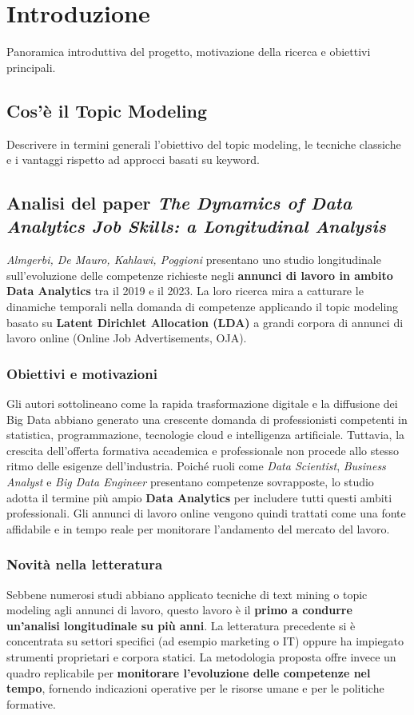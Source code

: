 \chapter{Introduzione}
Panoramica introduttiva del progetto, motivazione della ricerca e obiettivi principali.

\section{Cos'è il Topic Modeling}
Descrivere in termini generali l'obiettivo del topic modeling, le tecniche classiche e i vantaggi rispetto ad approcci basati su keyword.

\section{Analisi del paper \emph{The Dynamics of Data Analytics Job Skills: a Longitudinal Analysis}}

\textit{Almgerbi, De Mauro, Kahlawi, Poggioni} presentano uno studio longitudinale sull'evoluzione delle competenze richieste negli \textbf{annunci di lavoro in ambito Data Analytics} tra il 2019 e il 2023. 
La loro ricerca mira a catturare le dinamiche temporali nella domanda di competenze applicando il topic modeling basato su \textbf{Latent Dirichlet Allocation (LDA)} a grandi corpora di annunci di lavoro online (Online Job Advertisements, OJA).

\subsection{Obiettivi e motivazioni}
Gli autori sottolineano come la rapida trasformazione digitale e la diffusione dei Big Data abbiano generato una crescente domanda di professionisti competenti in statistica, programmazione, tecnologie cloud e intelligenza artificiale.
Tuttavia, la crescita dell'offerta formativa accademica e professionale non procede allo stesso ritmo delle esigenze dell'industria.
Poiché ruoli come \textit{Data Scientist}, \textit{Business Analyst} e \textit{Big Data Engineer} presentano competenze sovrapposte, lo studio adotta il termine più ampio \textbf{Data Analytics} per includere tutti questi ambiti professionali.
Gli annunci di lavoro online vengono quindi trattati come una fonte affidabile e in tempo reale per monitorare l'andamento del mercato del lavoro.

\subsection{Novità nella letteratura}
Sebbene numerosi studi abbiano applicato tecniche di text mining o topic modeling agli annunci di lavoro, questo lavoro è il \textbf{primo a condurre un'analisi longitudinale su più anni}.
La letteratura precedente si è concentrata su settori specifici (ad esempio marketing o IT) oppure ha impiegato strumenti proprietari e corpora statici.
La metodologia proposta offre invece un quadro replicabile per \textbf{monitorare l'evoluzione delle competenze nel tempo}, fornendo indicazioni operative per le risorse umane e per le politiche formative.

